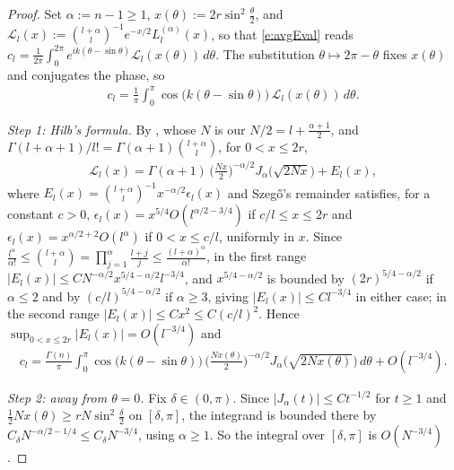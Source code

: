 \documentclass[11pt]{amsart}
\theoremstyle{plain}
\theoremstyle{definition}
\theoremstyle{remark}
\numberwithin{equation}{section}
\def\cL{\mathcal{L}}
\numberwithin{equation}{section}
\begin{document}
\begin{proof}
	Set $\alpha:=n-1\geq1$, $x(\theta):=2r\sin^2\tfrac{\theta}{2}$, and $\cL_l(x):=\binom{l+\alpha}{l}^{-1}e^{-x/2}L_l^{(\alpha)}(x)$, so that \eqref{e:avgEval} reads $c_l=\frac{1}{2\pi}\int_0^{2\pi}e^{ik(\theta-\sin\theta)}\cL_l(x(\theta))\,d\theta$. The substitution $\theta\mapsto2\pi-\theta$ fixes $x(\theta)$ and conjugates the phase, so
	\begin{align*}
		c_l=\frac{1}{\pi}\int_0^{\pi}\cos\big(k(\theta-\sin\theta)\big)\,\cL_l(x(\theta))\,d\theta.
	\end{align*}

	\textit{Step 1: Hilb's formula.} By \cite[Theorem 8.22.4]{szegoOrthogonalPolynomials1975}, whose $N$ is our $N/2=l+\tfrac{\alpha+1}{2}$, and $\Gamma(l+\alpha+1)/l!=\Gamma(\alpha+1)\binom{l+\alpha}{l}$, for $0<x\leq 2r$,
	\begin{align*}
		\cL_l(x)=\Gamma(\alpha+1)\,\big(\tfrac{Nx}{2}\big)^{-\alpha/2}J_\alpha\big(\sqrt{2Nx}\big)+E_l(x),
	\end{align*}
	where $E_l(x)=\binom{l+\alpha}{l}^{-1}x^{-\alpha/2}\epsilon_l(x)$ and Szeg\H{o}'s remainder satisfies, for a constant $c>0$, $\epsilon_l(x)=x^{5/4}O(l^{\alpha/2-3/4})$ if $c/l\leq x\leq 2r$ and $\epsilon_l(x)=x^{\alpha/2+2}O(l^{\alpha})$ if $0<x\leq c/l$, uniformly in $x$. Since $\frac{l^\alpha}{\alpha!}\leq\binom{l+\alpha}{l}=\prod_{j=1}^\alpha\frac{l+j}{j}\leq\frac{(l+\alpha)^\alpha}{\alpha!}$, in the first range $|E_l(x)|\leq CN^{-\alpha/2}x^{5/4-\alpha/2}l^{-3/4}$, and $x^{5/4-\alpha/2}$ is bounded by $(2r)^{5/4-\alpha/2}$ if $\alpha\leq2$ and by $(c/l)^{5/4-\alpha/2}$ if $\alpha\geq3$, giving $|E_l(x)|\leq Cl^{-3/4}$ in either case; in the second range $|E_l(x)|\leq Cx^2\leq C(c/l)^2$. Hence $\sup_{0<x\leq2r}|E_l(x)|=O(l^{-3/4})$ and
	\begin{align*}
		c_l=\frac{\Gamma(n)}{\pi}\int_0^{\pi}\cos\big(k(\theta-\sin\theta)\big)\,\big(\tfrac{Nx(\theta)}{2}\big)^{-\alpha/2}J_\alpha\big(\sqrt{2Nx(\theta)}\big)\,d\theta+O(l^{-3/4}).
	\end{align*}

	\textit{Step 2: away from $\theta=0$.} Fix $\delta\in(0, \pi)$. Since $|J_\alpha(t)|\leq Ct^{-1/2}$ for $t\geq1$ and $\tfrac12Nx(\theta)\geq rN\sin^2\tfrac{\delta}{2}$ on $[\delta, \pi]$, the integrand is bounded there by $C_\delta N^{-\alpha/2-1/4}\leq C_\delta N^{-3/4}$, using $\alpha\geq1$. So the integral over $[\delta, \pi]$ is $O(N^{-3/4})$.


\end{proof}
\end{document}
